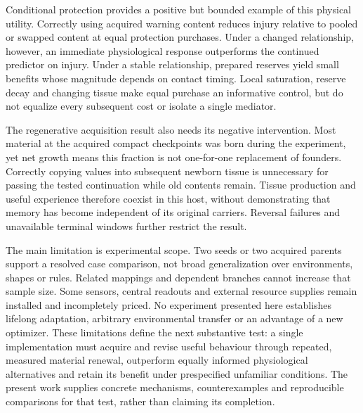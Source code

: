 Conditional protection provides a positive but bounded example of this physical utility. Correctly using acquired warning content reduces injury relative to pooled or swapped content at equal protection purchases. Under a changed relationship, however, an immediate physiological response outperforms the continued predictor on injury. Under a stable relationship, prepared reserves yield small benefits whose magnitude depends on contact timing. Local saturation, reserve decay and changing tissue make equal purchase an informative control, but do not equalize every subsequent cost or isolate a single mediator.

The regenerative acquisition result also needs its negative intervention. Most material at the acquired compact checkpoints was born during the experiment, yet net growth means this fraction is not one-for-one replacement of founders. Correctly copying values into subsequent newborn tissue is unnecessary for passing the tested continuation while old contents remain. Tissue production and useful experience therefore coexist in this host, without demonstrating that memory has become independent of its original carriers. Reversal failures and unavailable terminal windows further restrict the result.

The main limitation is experimental scope. Two seeds or two acquired parents support a resolved case comparison, not broad generalization over environments, shapes or rules. Related mappings and dependent branches cannot increase that sample size. Some sensors, central readouts and external resource supplies remain installed and incompletely priced. No experiment presented here establishes lifelong adaptation, arbitrary environmental transfer or an advantage of a new optimizer. These limitations define the next substantive test: a single implementation must acquire and revise useful behaviour through repeated, measured material renewal, outperform equally informed physiological alternatives and retain its benefit under prespecified unfamiliar conditions. The present work supplies concrete mechanisms, counterexamples and reproducible comparisons for that test, rather than claiming its completion.
